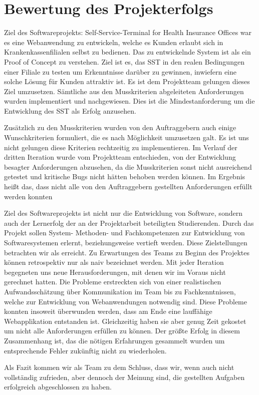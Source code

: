 \section{Bewertung des Projekterfolgs}

Ziel des Softwareprojekts: \glqq Self-Service-Terminal for Health Insurance Offices\grqq{} war es eine Webanwendung zu entwickeln, welche es Kunden erlaubt sich in Krankenkassenfilialen selbst zu bedienen. Das zu entwickelnde System ist als ein \glqq Proof of Concept\grqq{} zu verstehen. Ziel ist es, das SST in den realen Bedingungen einer Filiale zu testen um Erkenntnisse darüber zu gewinnen, inwiefern eine solche Lösung für Kunden attraktiv ist. Es ist dem Projektteam gelungen dieses Ziel umzusetzen. Sämtliche aus den Musskriterien abgeleiteten Anforderungen wurden implementiert und nachgewiesen. Dies ist die Mindestanforderung um die Entwicklung des SST als Erfolg anzusehen.\par
\noindent Zusätzlich zu den Musskriterien wurden von den Auftraggebern auch einige Wunschkriterien formuliert, die es nach Möglichkeit umzusetzen galt. Es ist uns nicht gelungen diese Kriterien rechtzeitig zu implementieren. Im Verlauf der dritten Iteration wurde vom Projektteam entschieden, von der Entwicklung besagter Anforderungen abzusehen, da die Musskriterien sonst nicht ausreichend getestet und kritische Bugs nicht hätten behoben werden können. Im Ergebnis heißt das, dass nicht alle von den Auftraggebern gestellten Anforderungen erfüllt werden konnten\par
\noindent Ziel des Softwareprojekts ist nicht nur die Entwicklung von Software, sondern auch der Lernerfolg der an der Projektarbeit beteiligten Studierenden. Durch das Projekt sollen System- Methoden- und Fachkompetenzen zur Entwicklung von Softwaresystemen erlernt, beziehungsweise vertieft werden. Diese Zielstellungen betrachten wir als erreicht. Zu Erwartungen des Teams zu Beginn des Projektes können retrospektiv nur als naiv bezeichnet werden. Mit jeder Iteration begegneten uns neue Herausforderungen, mit denen wir im Voraus nicht gerechnet hatten. Die Probleme erstreckten sich von einer realistischen Aufwandsschätzung über Kommunikation im Team bis zu Fachkenntnissen, welche zur Entwicklung von Webanwendungen notwendig sind. Diese Probleme konnten insoweit überwunden werden, dass am Ende eine lauffähige Webapplikation entstanden ist. Gleichzeitig haben sie aber genug Zeit gekostet um nicht alle Anforderungen erfüllen zu können. Der größte Erfolg in diesem Zusammenhang ist, das die nötigen Erfahrungen gesammelt wurden um entsprechende Fehler zukünftig nicht zu wiederholen.\par
\noindent Als Fazit kommen wir als Team zu dem Schluss, dass wir, wenn auch nicht vollständig zufrieden, aber dennoch der Meinung sind, die gestellten Aufgaben erfolgreich abgeschlossen zu haben. 